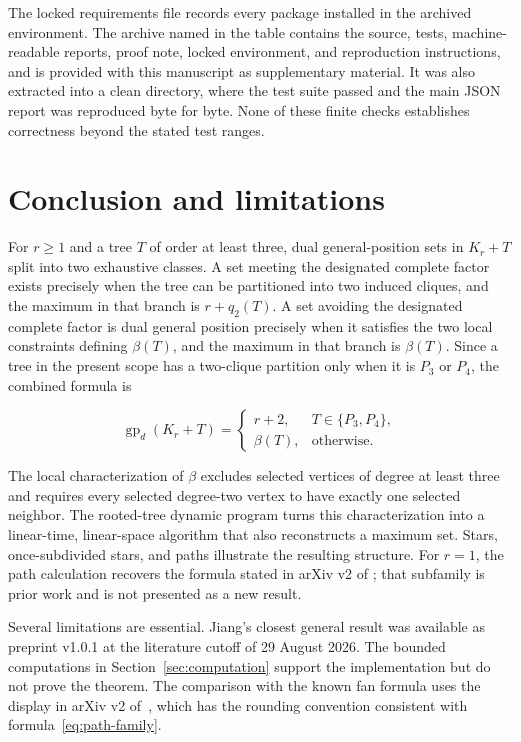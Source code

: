 \documentclass[11pt,a4paper]{article}
\numberwithin{equation}{section}
\begin{document}
The locked requirements file records every package installed in the archived
environment. The archive named in the table contains the source, tests,
machine-readable reports, proof note, locked environment, and reproduction
instructions, and is provided with this manuscript as supplementary material.
It was also extracted into a clean directory, where the test suite passed and
the main JSON report was reproduced byte for byte. None of these finite checks
establishes correctness beyond the stated test ranges.

\section{Conclusion and limitations}\label{sec:conclusion}

For \(r\ge 1\) and a tree \(T\) of order at least three, dual
general-position sets in \(K_r+T\) split into two exhaustive classes. A
set meeting the designated complete factor exists precisely when the tree can be
partitioned into two induced cliques, and the maximum in that branch is
\(r+q_2(T)\). A set avoiding the designated complete factor is dual general
position precisely when it satisfies the two local constraints defining
\(\beta(T)\), and the maximum in that branch is \(\beta(T)\). Since a
tree in the present scope has a two-clique partition only when it is
\(P_3\) or \(P_4\), the combined formula is

\[
\operatorname{gp}_d(K_r+T)=
\begin{cases}
r+2,&T\in\{P_3,P_4\},\\
\beta(T),&\text{otherwise}.
\end{cases}
\]

The local characterization of \(\beta\) excludes selected vertices of
degree at least three and requires every selected degree-two vertex to
have exactly one selected neighbor. The rooted-tree dynamic program
turns this characterization into a linear-time, linear-space algorithm
that also reconstructs a maximum set. Stars, once-subdivided stars, and
paths illustrate the resulting structure. For \(r=1\), the path
calculation recovers the formula stated in arXiv v2 of
\cite{tian-et-al-removal}; that subfamily is prior work and is not presented as
a new result.

Several limitations are essential. Jiang's closest general result
\cite{jiang-complete-first-factor} was available as preprint v1.0.1 at the
literature cutoff of 29 August 2026. The bounded computations in
Section~\ref{sec:computation} support the implementation but do not prove the
theorem. The comparison with the known fan formula uses the display in arXiv
v2 of~\cite{tian-et-al-removal}, which has the rounding convention consistent
with formula~\eqref{eq:path-family}.
\end{document}
